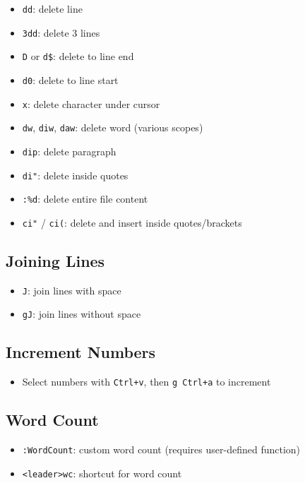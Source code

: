 \documentclass[
  letterpaper,
  DIV=11,
  numbers=noendperiod]{scrartcl}
\providecommand{\tightlist}{%
  \setlength{\itemsep}{0pt}\setlength{\parskip}{0pt}}\usepackage{longtable,booktabs,array}
\begin{document}
\begin{itemize}
\tightlist
\item
  \texttt{dd}: delete line
\item
  \texttt{3dd}: delete 3 lines
\item
  \texttt{D} or \texttt{d\$}: delete to line end
\item
  \texttt{d0}: delete to line start
\item
  \texttt{x}: delete character under cursor
\item
  \texttt{dw}, \texttt{diw}, \texttt{daw}: delete word (various scopes)
\item
  \texttt{dip}: delete paragraph
\item
  \texttt{di"}: delete inside quotes
\item
  \texttt{:\%d}: delete entire file content
\item
  \texttt{ci"} / \texttt{ci(}: delete and insert inside quotes/brackets
\end{itemize}

\subsection{Joining Lines}\label{joining-lines}

\begin{itemize}
\tightlist
\item
  \texttt{J}: join lines with space
\item
  \texttt{gJ}: join lines without space
\end{itemize}

\subsection{Increment Numbers}\label{increment-numbers}

\begin{itemize}
\tightlist
\item
  Select numbers with \texttt{Ctrl+v}, then \texttt{g\ Ctrl+a} to
  increment
\end{itemize}

\subsection{Word Count}\label{word-count}

\begin{itemize}
\tightlist
\item
  \texttt{:WordCount}: custom word count (requires user-defined
  function)
\item
  \texttt{\textless{}leader\textgreater{}wc}: shortcut for word count
\end{itemize}
\end{document}
